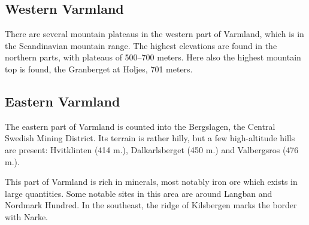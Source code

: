 \documentclass[a4paper, 11pt]{article}
\begin{document}
\subsection{Western Varmland}
There are several mountain plateaus in the western part of Varmland, which is in the Scandinavian mountain range. The highest elevations are found in the northern parts, with plateaus of 500–700 meters. Here also the highest mountain top is found, the Granberget at Holjes, 701 meters.

\subsection{Eastern Varmland}
The eastern part of Varmland is counted into the Bergslagen, the Central Swedish Mining District. Its terrain is rather hilly, but a few high-altitude hills are present: Hvitklinten (414 m.), Dalkarlsberget (450 m.) and Valbergsros (476 m.).

This part of Varmland is rich in minerals, most notably iron ore which exists in large quantities. Some notable sites in this area are around Langban and Nordmark Hundred. In the southeast, the ridge of Kilsbergen marks the border with Narke.

\end{document}
